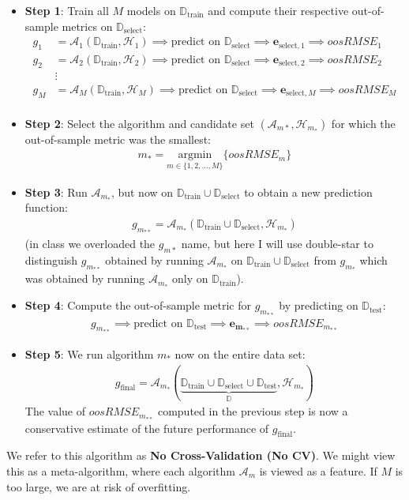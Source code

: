 \documentclass[12pt, a4paper]{article}
\theoremstyle{definition}
\newcommand{\test}{\text{test}}
\newcommand{\train}{\text{train}}
\newcommand{\select}{\text{select}}
\newcommand{\Dtest}{\mathbb{D}_{\test}}
\newcommand{\Dtrain}{\mathbb{D}_{\train}}
\newcommand{\Dselect}{\mathbb{D}_{\select}}
\begin{document}
	\begin{itemize}
		\item \textbf{Step 1}: Train all $M$ models on $\Dtrain$ and compute their respective
		out-of-sample metrics on $\Dselect$:
		\begin{align*}
			g_1&=\mathcal{A}_1(\mathbb{D}_{\text{train}}, \mathcal{H}_{1})\implies
			\text{predict on }\Dselect\implies
			\bm{e}_{\select,1}\implies oosRMSE_1\\
			g_2&=\mathcal{A}_2(\mathbb{D}_{\text{train}}, \mathcal{H}_{2})\implies
			\text{predict on }\Dselect\implies
			\bm{e}_{\select,2}\implies oosRMSE_2\\
			&\vdots\\
			g_M&=\mathcal{A}_M(\mathbb{D}_{\text{train}}, \mathcal{H}_{M})\implies
			\text{predict on }\Dselect\implies
			\bm{e}_{\select,M}\implies oosRMSE_M\\
		\end{align*}
		\item \textbf{Step 2}: Select the algorithm and candidate set
		$(\mathcal{A}_{m*}, \mathcal{H}_{m_*})$ for which the out-of-sample metric
		was the smallest:
		\begin{align*}
			m_* = \underset{m\in \{1,2,\ldots,M\}}{\text{argmin}}\{oosRMSE_m\}
		\end{align*}
		\item \textbf{Step 3}: Run $\mathcal{A}_{m_*}$, but now on $\Dtrain\cup \Dselect$
		to obtain a new prediction function:
		\begin{align*}
			g_{m_{**}} = \mathcal{A}_{m_*}(\Dtrain \cup \Dselect, \mathcal{H}_{m_*})
		\end{align*}
		(in class we overloaded the $g_{m*}$ name, but here I will use double-star to distinguish
		$g_{m_{**}}$ obtained by running $\mathcal{A}_{m_*}$ on $\Dtrain\cup\Dselect$
		from $g_{m_*}$ which was obtained by running $\mathcal{A}_{m_*}$ only on $\Dtrain$).
		\item \textbf{Step 4}: Compute the out-of-sample metric for $g_{m_{**}}$ by predicting on $\Dtest$:
		\begin{align*}
			g_{m_{**}}\implies \text{predict on } \Dtest\implies \bm{e_{m_{**}}}\implies oosRMSE_{m_{**}}
		\end{align*}
		\item \textbf{Step 5}: We run algorithm $m_{*}$ now on the entire data set:
		\begin{align*}
			g_{\text{final}} = \mathcal{A}_{m_*}\left(
			\underbrace{\Dtrain \cup \Dselect \cup \Dtest}_{\mathbb{D}}, \mathcal{H}_{m_*}
			\right)
		\end{align*}
		The value of $oosRMSE_{m_{**}}$ computed in the previous step is now a conservative
		estimate of the future performance of $g_{\text{final}}$.
	\end{itemize}
	We refer to this algorithm as \textbf{No Cross-Validation (No CV)}.
	We might view this as a meta-algorithm, where each algorithm $\mathcal{A}_m$ is viewed
	as a feature. If $M$ is too large, we are at risk of overfitting.
\end{document}
